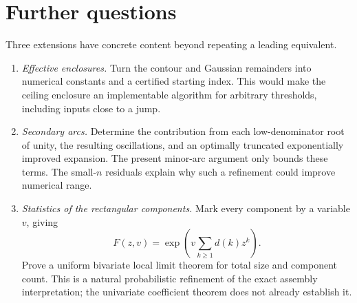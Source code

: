\documentclass[11pt,letterpaper]{article}
\numberwithin{equation}{section}
\theoremstyle{remark}
\begin{document}
\section{Further questions}\label{dwa:as:sec:questions}
Three extensions have concrete content beyond repeating a leading equivalent.
\begin{enumerate}
\item \emph{Effective enclosures.} Turn the contour and Gaussian remainders into numerical constants and a certified starting index. This would make the ceiling enclosure an implementable algorithm for arbitrary thresholds, including inputs close to a jump.
\item \emph{Secondary arcs.} Determine the contribution from each low-denominator root of unity, the resulting oscillations, and an optimally truncated exponentially improved expansion. The present minor-arc argument only bounds these terms. The small-$n$ residuals explain why such a refinement could improve numerical range.
\item \emph{Statistics of the rectangular components.} Mark every component by a variable $v$, giving
\[
 F(z,v)=\exp\left(v\sum_{k\ge1}d(k)z^k\right).
\]
Prove a uniform bivariate local limit theorem for total size and component count. This is a natural probabilistic refinement of the exact assembly interpretation; the univariate coefficient theorem does not already establish it.
\end{enumerate}
\end{document}
